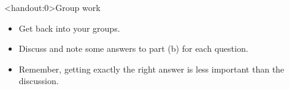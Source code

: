 \documentclass[xcolor=table, aspectratio=169, bigger, handout]{beamer}
\begin{document}
\begin{frame}<handout:0>{Group work}
\begin{block}{}
\begin{itemize}
\item Get back into your groups.
\item Discuss and note some answers to part (b) for each question.
\item Remember, getting exactly the right answer is less important than the discussion.
\end{itemize}
\end{block}
\end{frame}
\end{document}
